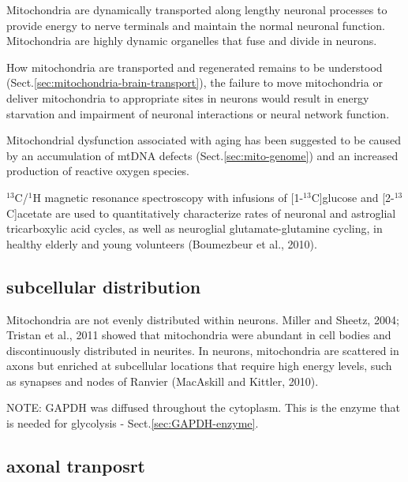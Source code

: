 Mitochondria are dynamically transported along lengthy neuronal processes to
provide energy to nerve terminals and maintain the normal neuronal function.
Mitochondria are highly dynamic organelles that fuse and divide in neurons.

How mitochondria are transported and regenerated remains to be understood
(Sect.\ref{sec:mitochondria-brain-transport}), the failure to move mitochondria
or deliver mitochondria to appropriate sites in neurons would result in energy
starvation and impairment of neuronal interactions or neural network function.

Mitochondrial dysfunction associated with aging has been suggested to be caused
by an accumulation of mtDNA defects (Sect.\ref{sec:mito-genome}) and an
increased production of reactive oxygen species.

\begin{mdframed}

$^{13}$C/$^{1}$H magnetic resonance spectroscopy with infusions of
[1-$^{13}$C]glucose and [2-$^{13}$C]acetate are used to quantitatively
characterize rates of neuronal and astroglial tricarboxylic acid cycles, as well
as neuroglial glutamate-glutamine cycling, in healthy elderly and young
volunteers (Boumezbeur et al., 2010).

\end{mdframed}

\subsection{subcellular distribution}
\label{sec:mitochondria-distribution-subcellular}

Mitochondria are not evenly distributed within neurons.
Miller and Sheetz, 2004; Tristan et al., 2011 showed that mitochondria were
abundant in cell bodies and discontinuously distributed in neurites.
In neurons, mitochondria are scattered in axons but enriched at subcellular
locations that require high energy levels, such as synapses and nodes of Ranvier
(MacAskill and Kittler, 2010).

NOTE: GAPDH was diffused throughout the cytoplasm. This is the enzyme that is
needed for glycolysis - Sect.\ref{sec:GAPDH-enzyme}.


\subsection{axonal tranposrt}
\label{sec:axonal-transport}
\label{sec:microtubule}

